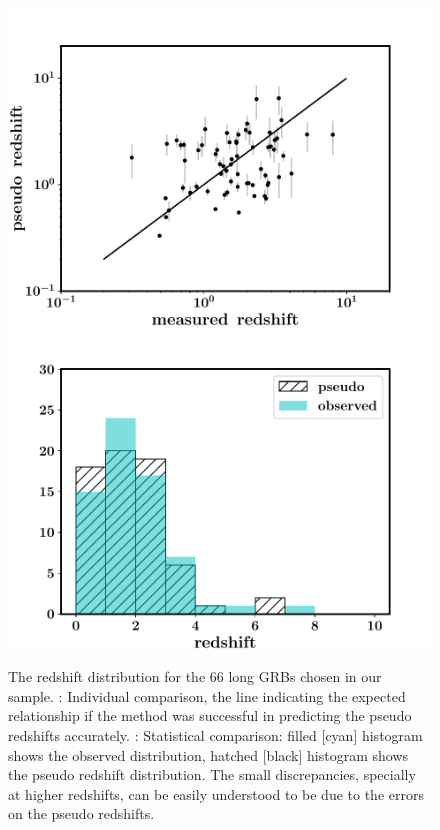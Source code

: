 \begin{figure}
\begin{center}
\includegraphics[scale=0.42]{redshift_comparison}
\includegraphics[scale=0.42]{distribution--my_bestfit}
\caption[Observed versus pseudo redshifts]{The redshift distribution for the $66$ long GRBs chosen in our sample. \eL: Individual comparison, the line indicating the expected relationship if the method was successful in predicting the pseudo redshifts accurately. \eR: Statistical comparison: filled [cyan] histogram shows the observed distribution, hatched [black] histogram shows the pseudo redshift distribution. The small discrepancies, specially at higher redshifts, can be easily understood to be due to the errors on the pseudo redshifts.}
\label{fig:redshift_distribution--bestfit}
\end{center}
\end{figure}

